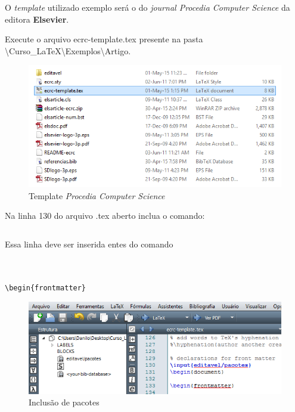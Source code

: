 \begin{frame}
O {\it template} utilizado exemplo será o do {\it journal Procedia Computer Science} da editora \textbf{Elsevier}.

Execute o arquivo {\code ecrc-template.tex} presente na pasta {\code\textbackslash Curso\_LaTeX\textbackslash Exemplos\textbackslash Artigo}.
\begin{figure}
\begin{center}
\includegraphics[scale=0.5]{figuras/figelsiever}
\caption{Template \textit{Procedia Computer Science}}
\end{center}
\end{figure}
\end{frame}

\begin{frame}[fragile]
Na linha 130 do arquivo .tex aberto inclua o comando:
\begin{verbatim}

\end{verbatim}

Essa linha deve ser inserida entes do comando

\begin{verbatim}


\begin{frontmatter}
\end{verbatim}

\begin{figure}
\begin{center}
\includegraphics[scale=0.5]{figuras/fig2}
\caption{Inclusão de pacotes}
\end{center}
\end{figure}
\end{frame}



